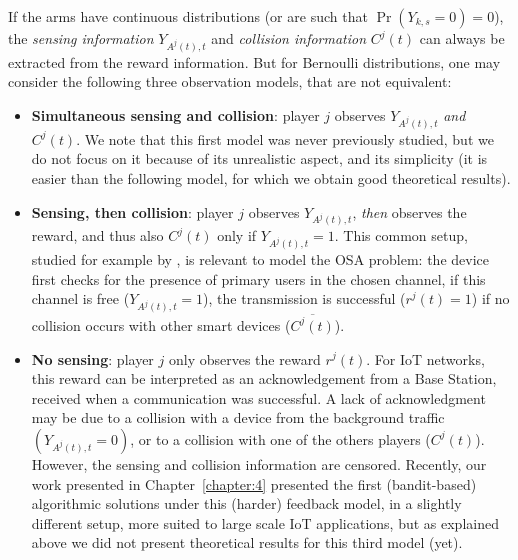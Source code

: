 If the arms have continuous distributions (or are such that  $\Pr(Y_{k,s}=0)=0$), the \emph{sensing information} $Y_{A^j(t),t}$ and \emph{collision information} $C^j(t)$ can always be extracted from the reward information.
But for Bernoulli distributions, one may consider the following three observation models, that are not equivalent:

\begin{itemize}
  \item[\modelun]
    \textbf{Simultaneous sensing and collision}: player $j$ observes  $Y_{A^j(t),t}$ \emph{and} $C^j(t)$.
    We note that this first model was never previously studied, but we do not focus on it because of its unrealistic aspect, and its simplicity (it is easier than the following model, for which we obtain good theoretical results).
  \item[\modeldeux]
    \textbf{Sensing, then collision}: player $j$ observes $Y_{A^j(t),t}$, \emph{then} observes the reward, and thus also $C^j(t)$ only if $Y_{A^j(t),t} = 1$.
    This common setup, studied for example by \cite{Anandkumar11,Rosenski16}, is relevant to model the OSA problem: the device first checks for the presence of primary users in the chosen channel,
    if this channel is free ($Y_{A^j(t),t}=1$), the transmission is successful ($r^j(t)=1$) if no collision occurs with other smart devices ($\overline{C^j(t)}$).
  \item[\modeltrois]
    \textbf{No sensing}: player $j$ only observes the reward $r^j(t)$.
    For IoT networks, this reward can be interpreted as an acknowledgement from a Base Station,
    received when a communication was successful.
    A lack of acknowledgment may be due to a collision
    with a device from the background traffic $(Y_{A^j(t),t}=0)$,
    or to a collision with one of the others players ($C^j(t)$).
    However, the sensing and collision information are censored.
    Recently, our work presented in Chapter~\ref{chapter:4} \cite{Bonnefoi17} presented the first (bandit-based) algorithmic solutions under this (harder) feedback model, in a slightly different setup, more suited to large scale IoT applications, but as explained above we did not present theoretical results for this third model (yet).
\end{itemize}

